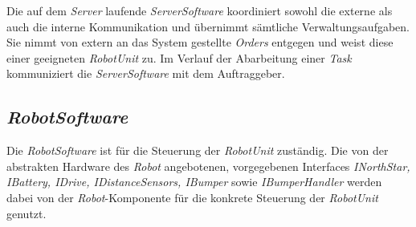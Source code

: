 Die auf dem \emph{Server} laufende \emph{ServerSoftware} koordiniert sowohl die externe als auch die interne Kommunikation und übernimmt sämtliche Verwaltungsaufgaben. Sie nimmt von extern an das System gestellte \emph{Orders} entgegen und weist diese einer geeigneten \emph{RobotUnit} zu. Im Verlauf der Abarbeitung einer \emph{Task} kommuniziert die \emph{ServerSoftware} mit dem Auftraggeber.

\subsection{\textit{RobotSoftware}}

Die \emph{RobotSoftware} ist für die Steuerung der \textit{RobotUnit} zuständig. 
Die von der abstrakten Hardware des \textit{Robot} angebotenen, vorgegebenen Interfaces \textit{INorthStar, IBattery, IDrive, IDistanceSensors, IBumper} sowie
\textit{IBumperHandler} werden dabei von der \textit{Robot}-Komponente für die konkrete Steuerung der \textit{RobotUnit} genutzt.
